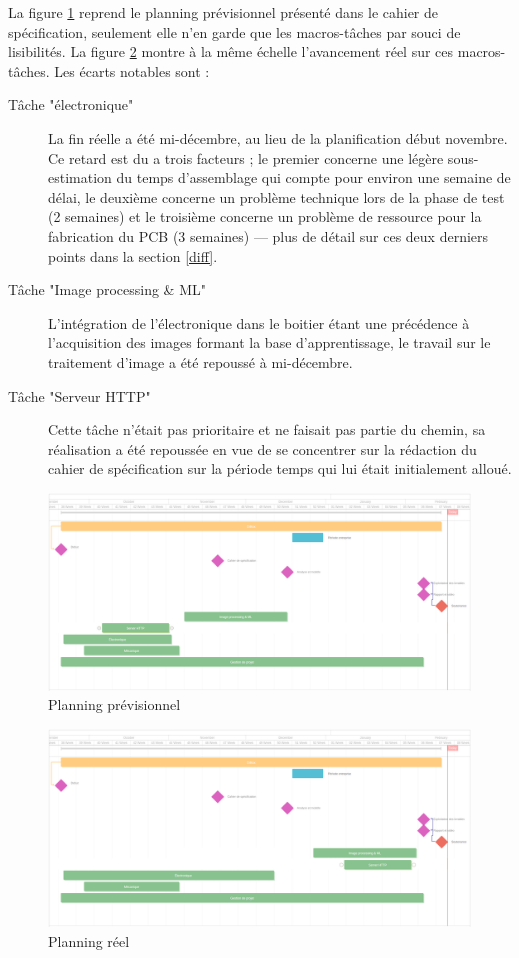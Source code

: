 \documentclass[a4paper]{report}
\begin{document}
La figure \ref{ganttinit} reprend le planning prévisionnel présenté dans le cahier de spécification, seulement elle n'en garde que les macros-tâches par souci de lisibilités.
La figure \ref{ganttfinal} montre à la même échelle l'avancement réel sur ces macros-tâches.
Les écarts notables sont :
\begin{description}
    \item[Tâche "électronique"] La fin réelle a été mi-décembre, au lieu de la planification début novembre.
    Ce retard est du a trois facteurs ; le premier concerne une légère sous-estimation du temps d'assemblage qui compte pour environ une semaine de délai, le deuxième concerne un problème technique lors de la phase de test (2 semaines) et le troisième concerne un problème de ressource pour la fabrication du PCB (3 semaines) --- plus de détail sur ces deux derniers points dans la section \ref{diff}.
    \item[Tâche "Image processing \& ML"] L'intégration de l'électronique dans le boitier étant une précédence à l'acquisition des images formant la base d'apprentissage, le travail sur le traitement d'image a été repoussé à mi-décembre.
    \item[Tâche "Serveur HTTP"] Cette tâche n'était pas prioritaire et ne faisait pas partie du chemin,  sa réalisation a été repoussée en vue de se concentrer sur la rédaction du cahier de spécification sur la période temps qui lui était initialement alloué.
\end{description}

\begin{figure}[H]
    \centering
    \includegraphics[width=\textwidth]{ganttproInit}
    \caption{Planning prévisionnel}
    \label{ganttinit}
\end{figure}

\begin{figure}[H]
    \centering
    \includegraphics[width=\textwidth]{ganttproFinal}
    \caption{Planning réel}
    \label{ganttfinal}
\end{figure}
\end{document}
